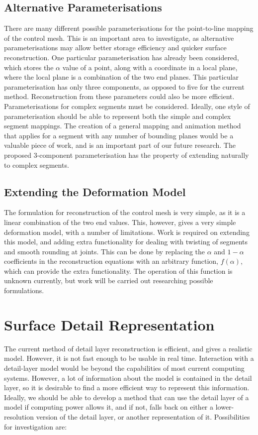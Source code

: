 \documentclass[10pt,oneside,fleqn,a4paper]{book}
\begin{document}
\subsection{\label{sec:futureparam}Alternative Parameterisations}
There are many different possible parameterisations for the point-to-line mapping of the control mesh. This is an important area to investigate, as alternative parameterisations may allow better storage efficiency and quicker surface reconstruction. One particular parameterisation has already been considered, which stores the $\alpha$ value of a point, along with a coordinate in a local plane, where the local plane is a combination of the two end planes. This particular parameterisation has only three components, as opposed to five for the current method. Reconstruction from these parameters could also be more efficient. Parameterisations for complex segments must be considered. Ideally, one style of parameterisation should be able to represent both the simple and complex segment mappings. The creation of a general mapping and animation method that applies for a segment with any number of bounding planes would be a valuable piece of work, and is an important part of our future research. The proposed 3-component parameterisation has the property of extending naturally to complex segments.


\subsection{\label{sec:futuredeformation}Extending the Deformation Model}
The formulation for reconstruction of the control mesh is very simple, as it is a linear combination of the two end values. This, however, gives a very simple deformation model, with a number of limitations. Work is required on extending this model, and adding extra functionality for dealing with twisting of segments and smooth rounding at joints. This can be done by replacing the $\alpha$ and $1-\alpha$ coefficients in the reconstruction equations with an arbitrary function, $f(\alpha)$, which can provide the extra functionality. The operation of this function is unknown currently, but work will be carried out researching possible formulations. 

\section{\label{sec:futuredetail}Surface Detail Representation}
The current method of detail layer reconstruction is efficient, and gives a realistic model. However, it is not fast enough to be usable in real time. Interaction with a detail-layer model would be beyond the capabilities of most current computing systems. However, a lot of information about the model is contained in the detail layer, so it is desirable to find a more efficient way to represent this information. Ideally, we should be able to develop a method that can use the detail layer of a model if computing power allows it, and if not, falls back on either a lower-resolution version of the detail layer, or another representation of it. Possibilities for investigation are:
\end{document}
